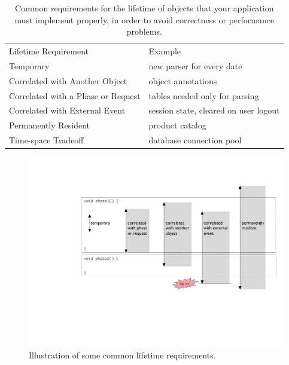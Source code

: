 \begin{table}
\centering
	\begin{tabular}{ll}
	\toprule
	   Lifetime Requirement & Example \\ \cmidrule(r){1-1} \cmidrule(l){2-2}
	  Temporary & new parser for every date
	\\
	Correlated with Another Object & object annotations
	\\
	Correlated with a Phase or Request & tables needed only for parsing
	\\
	Correlated with External Event & session state, cleared on user logout 
	\\
	 Permanently Resident & product catalog
	\\
	 Time-space Tradeoff & database connection pool
	  \\
	\bottomrule
	\end{tabular}
	\caption{Common requirements for the lifetime of objects that your
	application must implement properly, in order to avoid correctness or
	performance problems.}
	\label{tab:five-lifetimes}
\end{table}

\begin{figure}
\centering
\includegraphics[width=\textwidth]{part4/Figures/requirements}
\caption{Illustration of some common lifetime requirements.}
\label{fig:five-lifetimes}
\end{figure}

